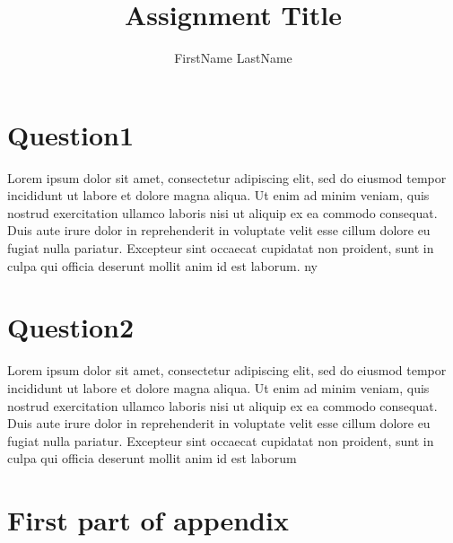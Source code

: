 \documentclass[
    12pt	%
    ]{article}
\title{Assignment Title}
\author{FirstName LastName}
\begin{document}
  
\maketitle


\tableofcontents
\listoffigures
\listoftables

\section{Question1}
Lorem ipsum dolor sit amet, consectetur adipiscing elit, sed do eiusmod tempor incididunt ut labore et dolore magna aliqua. Ut enim ad minim veniam, quis nostrud exercitation ullamco laboris nisi ut aliquip ex ea commodo consequat. Duis aute irure dolor in reprehenderit in voluptate velit esse cillum dolore eu fugiat nulla pariatur. Excepteur sint occaecat cupidatat non proident, sunt in culpa qui officia deserunt mollit anim id est laborum. \ac{ny}

\section{Question2}
Lorem ipsum dolor sit amet, consectetur adipiscing elit, sed do eiusmod tempor incididunt ut labore et dolore magna aliqua. Ut enim ad minim veniam, quis nostrud exercitation ullamco laboris nisi ut aliquip ex ea commodo consequat. Duis aute irure dolor in reprehenderit in voluptate velit esse cillum dolore eu fugiat nulla pariatur. Excepteur sint occaecat cupidatat non proident, sunt in culpa qui officia deserunt mollit anim id est laborum \cite{zorlu2005effect}







\appendix
\section{First part of appendix}

\printacronyms[include-classes=abbrev,name=Abbreviations]
\end{document}

